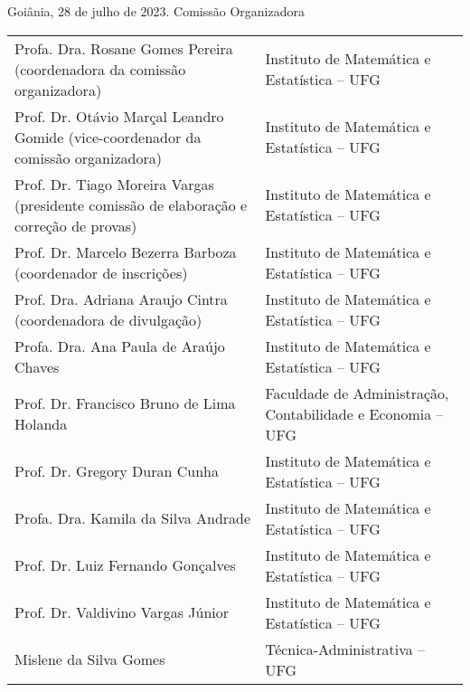 \documentclass[a4paper,12pt]{article}
\begin{document}
Goiânia, 28 de julho de 2023.
Comissão Organizadora

\begin{tabular}{ll}
  Profa. Dra. Rosane Gomes Pereira (coordenadora da comissão organizadora)                & Instituto de Matemática e Estatística – UFG\\
  Prof. Dr. Otávio Marçal Leandro Gomide (vice-coordenador da comissão organizadora)      & Instituto de Matemática e Estatística – UFG\\
  Prof. Dr. Tiago Moreira Vargas (presidente comissão de elaboração e correção de provas) & Instituto de Matemática e Estatística – UFG\\
  Prof. Dr. Marcelo Bezerra Barboza (coordenador de inscrições)                           & Instituto de Matemática e Estatística – UFG\\
  Prof. Dra. Adriana Araujo Cintra (coordenadora de divulgação)                           & Instituto de Matemática e Estatística – UFG\\
  Profa. Dra. Ana Paula de Araújo Chaves                                                  & Instituto de Matemática e Estatística – UFG\\
  Prof. Dr. Francisco Bruno de Lima Holanda                                               & Faculdade de Administração, Contabilidade e Economia – UFG\\
  Prof. Dr. Gregory Duran Cunha                                                           & Instituto de Matemática e Estatística – UFG\\
  Profa. Dra. Kamila da Silva Andrade                                                     & Instituto de Matemática e Estatística – UFG\\
  Prof. Dr. Luiz Fernando Gonçalves                                                       & Instituto de Matemática e Estatística – UFG\\
  Prof. Dr. Valdivino Vargas Júnior                                                       & Instituto de Matemática e Estatística – UFG\\
  Mislene da Silva Gomes & Técnica-Administrativa – UFG
\end{tabular}
\end{document}
